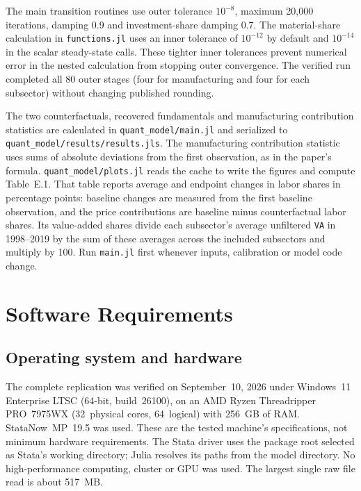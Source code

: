 \documentclass[11pt]{article}
\newcommand{\pkgfile}[1]{\nolinkurl{#1}}
\begin{document}
The main transition routines use outer tolerance $10^{-8}$, maximum
20,000 iterations, damping 0.9 and investment-share damping 0.7. The
material-share calculation in \pkgfile{functions.jl} uses an inner
tolerance of $10^{-12}$ by default and $10^{-14}$ in the scalar
steady-state calls. These tighter inner tolerances prevent numerical
error in the nested calculation from stopping outer convergence. The
verified run completed all 80 outer stages (four for manufacturing and
four for each subsector) without changing published rounding.

The two counterfactuals, recovered fundamentals and manufacturing
contribution statistics are calculated in \pkgfile{quant_model/main.jl}
and serialized to \pkgfile{quant_model/results/results.jls}. The
manufacturing contribution statistic uses sums of absolute deviations from
the first observation, as in the paper's formula.
\pkgfile{quant_model/plots.jl} reads the cache to write the figures and
compute Table~E.1. That table reports average and endpoint changes in
labor shares in percentage points: baseline changes are measured from
the first baseline observation, and the price contributions are baseline
minus counterfactual labor shares. Its value-added shares divide each
subsector's average unfiltered \texttt{VA} in 1998--2019 by the sum of
these averages across the included subsectors and multiply by 100.
Run \pkgfile{main.jl} first whenever inputs, calibration or model code change.


\section{Software Requirements}

\subsection*{Operating system and hardware}

The complete replication was verified on September~10, 2026 under
Windows~11 Enterprise LTSC (64-bit, build~26100), on an AMD Ryzen
Threadripper PRO~7975WX (32~physical cores, 64~logical) with 256~GB of RAM.
StataNow~MP~19.5 was used. These are the tested machine's
specifications, not minimum hardware requirements.
The Stata driver uses the package root selected as Stata's working
directory; Julia resolves its paths from the model directory.
No high-performance computing, cluster or GPU was used. The largest
single raw file read is about 517~MB.
\end{document}
